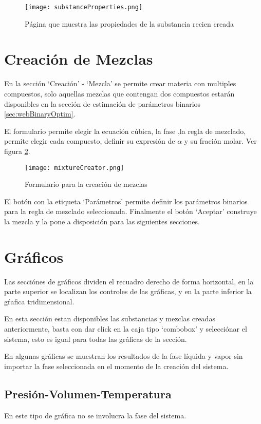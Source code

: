 	\begin{figure}[!h]
		\texttt{[image: substanceProperties.png]}
		\caption{Página que muestra las propiedades de la substancia recien creada}
		\label{fig:substanceProperties}
	\end{figure}

\section{Creación de Mezclas}\label{sec:webMixtureCreator}

	En la sección `Creación' - `Mezcla' se permite crear materia con multiples compuestos, solo aquellas mezclas que contengan dos compuestos estarán disponibles en la sección de estimación de parámetros binarios \ref{sec:webBinaryOptim}.

	El formulario permite elegir la ecuación cúbica, la fase ,la regla de mezclado, permite elegir cada compuesto, definir su expresión de $\alpha$ y su fración molar. Ver figura \ref{fig:webMixCreator}.

	\begin{figure}[!h]
		\texttt{[image: mixtureCreator.png]}
		\caption{Formulario para la creación de mezclas}
		\label{fig:webMixCreator}
	\end{figure}

	El botón con la etiqueta `Parámetros' permite definir los parámetros binarios para la regla de mezclado seleccionada. Finalmente el botón `Aceptar' construye la mezcla y la pone a disposición para las siguientes secciones.

\section{Gráficos}

	Las secciónes de gráficos dividen el recuadro derecho de forma horizontal, en la parte superior se localizan los controles de las gráficas, y en la parte inferior la gŕafica tridimensional.

	En esta sección estan disponibles las substancias y mezclas creadas anteriormente, basta con dar click en la caja tipo `combobox' y selecciónar el sistema, esto es igual para todas las gráficas de la sección.

	En algunas gráficas se muestran los resultados de la fase líquida y vapor sin importar la fase seleccionada en el momento de la creación del sistema.

	\subsection{Presión-Volumen-Temperatura}\label{subsec:pvt}
		En este tipo de gráfica no se involucra la fase del sistema. 

